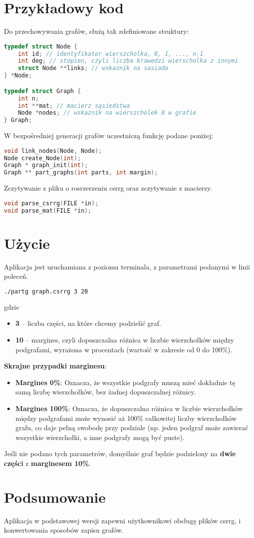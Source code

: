 \documentclass[a4paper,12pt]{article}
\begin{document}
\section{Przykładowy kod}
Do przechowywania grafów, służą tak zdefiniowane struktury:
\begin{lstlisting}[language=C, caption=struktura grafu]
typedef struct Node {
    int id; // identyfikator wierszcholka, 0, 1, ..., n-1
    int deg; // stopien, czyli liczba krawedzi wierscholka z innymi
    struct Node **links; // wskaznik na sasiada
} *Node;

typedef struct Graph {
    int n; 
    int **mat; // macierz sąsiedstwa
    Node *nodes; // wskaznik na wierszcholek 0 w grafie
} Graph;
\end{lstlisting}
W bezpośredniej generacji grafów uczestniczą funkcję podane poniżej:
\begin{lstlisting}[language=C, caption=generacja]
void link_nodes(Node, Node);
Node create_Node(int);
Graph * graph_init(int);
Graph ** part_graphs(int parts, int margin);
\end{lstlisting}
Zczytywanie z pliku o rosrzerzeniu csrrg oraz zczytywanie z macierzy.
\begin{lstlisting}[language=C, caption=parsowanie i konwertowanie]
void parse_csrrg(FILE *in);
void parse_mat(FILE *in);
\end{lstlisting}

\section{Użycie}
Aplikacja jest uruchamiana z poziomu terminala, z parametrami podanymi w linii poleceń.
\begin{lstlisting}[language=bash, caption= Przykład uruchomienia programu w terminalu]
./partg graph.csrrg 3 20
\end{lstlisting}
gdzie 
\begin{itemize}
    \item \textbf{3} – liczba części, na które chcemy podzielić graf.
    \item \textbf{10} – margines, czyli dopuszczalna różnica w liczbie wierzchołków między podgrafami, wyrażona w procentach (wartość w zakresie od 0 do 100\%).
\end{itemize}

\textbf{Skrajne przypadki marginesu}:
\begin{itemize}
    \item \textbf{Margines 0\%}: Oznacza, że wszystkie podgrafy muszą mieć dokładnie tę samą liczbę wierzchołków, bez żadnej dopuszczalnej różnicy.
    \item \textbf{Margines 100\%}: Oznacza, że dopuszczalna różnica w liczbie wierzchołków między podgrafami może wynosić aż 100\% całkowitej liczby wierzchołków grafu, co daje pełną swobodę przy podziale (np. jeden podgraf może zawierać wszystkie wierzchołki, a inne podgrafy mogą być puste).
\end{itemize}

Jeśli nie podano tych parametrów, domyślnie graf będzie podzielony na \textbf{dwie części} z \textbf{marginesem 10\%}.

\section{Podsumowanie}
Aplikacja w podstawowej wersji zapewni użytkownikowi obsługę plików csrrg, i konwertowania sposobów zapisu grafów.
\end{document}
